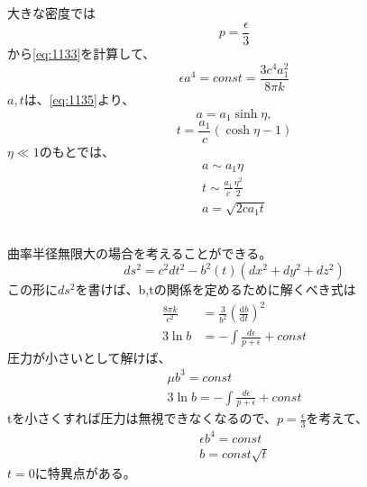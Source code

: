 \documentclass{jsarticle}
\newcommand{\dder}[2][]{\frac{\mathrm{d}#1}{\mathrm{d}#2}}
\newcommand{\beq}{\begin{equation}}
\newcommand{\eeq}{\end{equation}}
\begin{document}
\subsection{}
大きな密度では
\beq
    p = \frac{\epsilon}{3}
\eeq
から\eqref{eq:1133}を計算して、
\beq
    \epsilon a^4 = const = \frac{3c^4a_1^2}{8\pi k}
\eeq
$a,t$は、\eqref{eq:1135}より、
\beq
    a = a_1 \sinh\eta ,\eeq
\beq
t = \frac{a_1}{c}(\cosh\eta - 1)
\eeq
$\eta \ll 1$のもとでは、
\begin{align}
    a \sim a_1 \eta\\
    t \sim \frac{a_1}{c}\frac{\eta^2}{2}\\
    a = \sqrt{2ca_1t}
\end{align}
\subsection{}
曲率半径無限大の場合を考えることができる。
\beq
    ds^2 = c^2 dt^2 - b^2(t)(dx^2 + dy^2 + dz^2)
\eeq
この形に$ds^2$を書けば、b,tの関係を定めるために解くべき式は
\begin{align}
    \frac{8\pi k}{c^2} &= \frac{3}{b^2}(\dder[b]{t})^2\\
    3\ln b &= - \int \frac{d\epsilon}{p + \epsilon} + const
\end{align}
圧力が小さいとして解けば、
\begin{align}
    \mu b^3 = const\\
    3 \ln b = - \int \frac{d\epsilon}{p + \epsilon} + const
\end{align}
tを小さくすれば圧力は無視できなくなるので、$p = \frac{\epsilon}{3}$を考えて、
\begin{align}
    \epsilon b^4 = const\\
    b = const \sqrt{t}
\end{align}
$t=0$に特異点がある。
\end{document}
